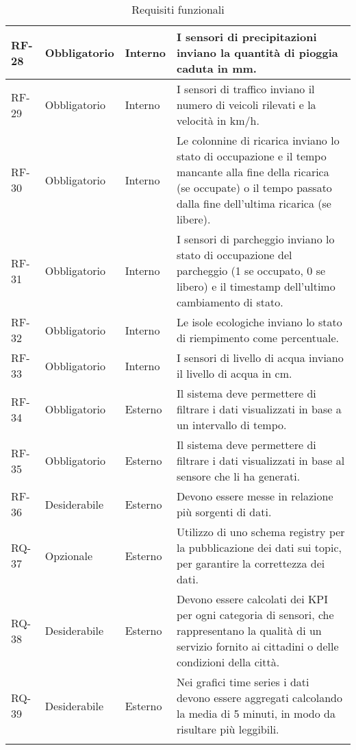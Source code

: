 \begin{longtable}{|>{\centering\arraybackslash}m{}|>{\centering\arraybackslash}m{}|>{\centering\arraybackslash}m{}|>{\centering\arraybackslash}m{}|}
	RF-28           & Obbligatorio        & Interno        & I sensori di precipitazioni inviano la quantità di pioggia caduta in mm.
	\\\hline
	RF-29           & Obbligatorio        & Interno        & I sensori di traffico inviano il numero di veicoli rilevati e la velocità in km/h.
	\\\hline
	RF-30           & Obbligatorio        & Interno        & Le colonnine di ricarica inviano lo stato di occupazione e il tempo mancante alla fine della ricarica (se occupate) o il tempo passato dalla fine dell'ultima ricarica (se libere).
	\\\hline
	RF-31           & Obbligatorio        & Interno        & I sensori di parcheggio inviano lo stato di occupazione del parcheggio (1 se occupato, 0 se libero) e il timestamp dell'ultimo cambiamento di stato.
	\\\hline
	RF-32           & Obbligatorio        & Interno        & Le isole ecologiche inviano lo stato di riempimento come percentuale.
	\\\hline
	RF-33           & Obbligatorio        & Interno        & I sensori di livello di acqua inviano il livello di acqua in cm.
	\\\hline
	RF-34           & Obbligatorio        & Esterno        & Il sistema deve permettere di filtrare i dati visualizzati in base a un intervallo di tempo.
	\\\hline
	RF-35           & Obbligatorio        & Esterno        & Il sistema deve permettere di filtrare i dati visualizzati in base al sensore che li ha generati.
	\\\hline
	RF-36           & Desiderabile        & Esterno        & Devono essere messe in relazione più sorgenti di dati.
	\\\hline
	RQ-37           & Opzionale           & Esterno        & Utilizzo di uno schema registry per la pubblicazione dei dati sui topic, per garantire la correttezza dei dati.
	\\\hline
	RQ-38           & Desiderabile        & Esterno        & Devono essere calcolati dei KPI per ogni categoria di sensori, che rappresentano la qualità di un servizio fornito ai cittadini o delle condizioni della città.
	\\\hline
	RQ-39           & Desiderabile        & Esterno        & Nei grafici time series i dati devono essere aggregati calcolando la media di 5 minuti, in modo da risultare più leggibili.
	\\\hline
	\caption{Requisiti funzionali}
	\label{table:1}
\end{longtable}

